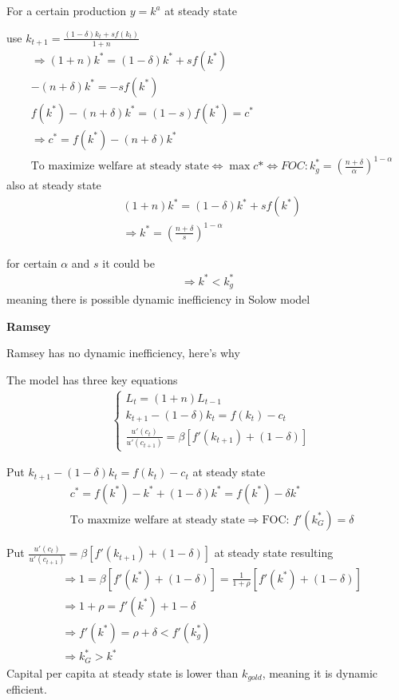 \documentclass{article}
\begin{document}
For a certain production $y=k^a$ at steady state

use $k_{t+1}=\frac{(1-\delta)k_{t}+s f(k_{t})}{1+n}$
\begin{align}
&\Rightarrow(1+n)k^*=(1-\delta)k^*+s f(k^*)
\\&-(n+\delta)k^*=-s f(k^*)
\\&f(k^*)-(n+\delta)k^*=(1-s) f(k^*)=c^*
\\&\Rightarrow c^*=f(k^*)-(n+\delta)k^*
\\&\text{To maximize welfare at steady state} \iff \max c* \iff FOC: k^*_g=(\frac{n+\delta}{\alpha})^{1-\alpha}
\end{align}
also at steady state
\begin{align}
&(1+n)k^*=(1-\delta)k^*+s f(k^*) 
\\&\Rightarrow k^*=(\frac{n+\delta}{s})^{1-\alpha}
\end{align}

for certain $\alpha$ and $s$ it could be
\begin{align}
\Rightarrow k^*<k^*_{g}
\end{align}
meaning there is possible dynamic inefficiency in Solow model

\textbf{Ramsey}

Ramsey has no dynamic inefficiency, here's why

The model has three key equations
\begin{align}
&\begin{cases}L_{t}=(1+n)L_{t-1} \\
k_{t+1}-(1-\delta)k_t=f(k_t)-c_t \\
\frac{u'(c_{t})}{u'(c_{t+1})}=\beta[f'(k_{t+1})+(1-\delta)]
\end{cases}
\end{align}

Put $k_{t+1}-(1-\delta)k_t=f(k_t)-c_t$ at steady state
\begin{align}
&c^*=f(k^*)-k^*+(1-\delta)k^*=f(k^*)-\delta k^*
\\& \text{To maxmize welfare at steady state}\Rightarrow \text{FOC: } f'(k^{*}_{G})=\delta
\end{align}

Put $\frac{u'(c_{t})}{u'(c_{t+1})}=\beta[f'(k_{t+1})+(1-\delta)]$ at steady state resulting
\begin{align}
&\Rightarrow 1= \beta [f'(k^{*})+(1-\delta)] =\frac{1}{1+\rho} [f'(k^{*})+(1-\delta)] 
\\&\Rightarrow 1+\rho=f'(k^{*})+1- \delta
\\&\Rightarrow f'(k^{*})=\rho +\delta < f'(k^*_g)
\\&\Rightarrow k^{*}_{G}>k^{*}
\end{align}
Capital per capita at steady state is lower than $k_{gold}$, meaning it is dynamic efficient.
\end{document}
